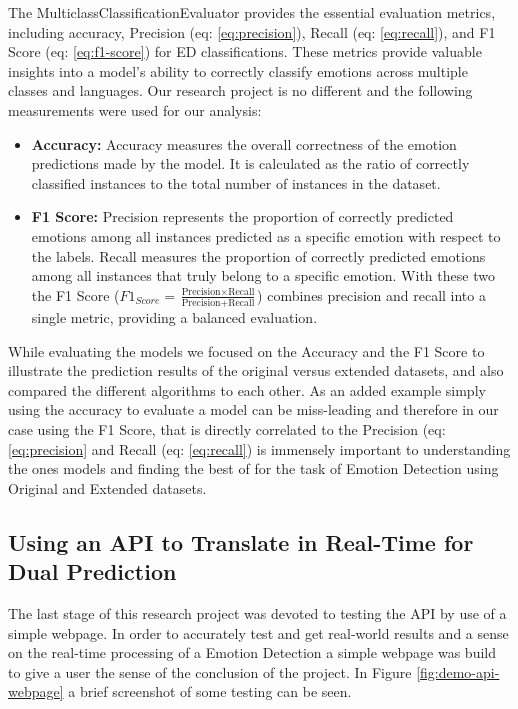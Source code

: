 \documentclass[11pt]{article}
\begin{document}
The MulticlassClassificationEvaluator provides the essential evaluation metrics, including accuracy, Precision (eq: \ref{eq:precision}), Recall (eq: \ref{eq:recall}), and F1 Score (eq: \ref{eq:f1-score}) for ED classifications. These metrics provide valuable insights into a model's ability to correctly classify emotions across multiple classes and languages. Our research project is no different and the following measurements were used for our analysis:
\begin{itemize}

\item \textbf{Accuracy:} Accuracy measures the overall correctness of the emotion predictions made by the model. It is calculated as the ratio of correctly classified instances to the total number of instances in the dataset.

\item \textbf{F1 Score:} Precision represents the proportion of correctly predicted emotions among all instances predicted as a specific emotion with respect to the labels. Recall measures the proportion of correctly predicted emotions among all instances that truly belong to a specific emotion. With these two the F1 Score ($F1_{Score}=\frac{\text{Precision} \times \text{Recall}}{\text{Precision} + \text{Recall}}$) combines precision and recall into a single metric, providing a balanced evaluation.

\end{itemize}

While evaluating the models we focused on the Accuracy and the F1 Score to illustrate the prediction results of the original versus extended datasets, and also compared the different algorithms to each other. As an added example simply using the accuracy to evaluate a model can be miss-leading and therefore in our case using the F1 Score, that is directly correlated to the Precision (eq: \ref{eq:precision} and Recall (eq: \ref{eq:recall}) is immensely important to understanding the ones models and finding the best of for the task of Emotion Detection using Original and Extended datasets.

\subsection{Using an API to Translate in Real-Time for Dual Prediction}
\label{sec:using-api-to-translate-in-ral-time}
The last stage of this research project was devoted to testing the API by use of a simple webpage. In order to accurately test and get real-world results and a sense on the real-time processing of a Emotion Detection a simple webpage was build to give a user the sense of the conclusion of the project. In Figure \ref{fig:demo-api-webpage} a brief screenshot of some testing can be seen. 
\end{document}
